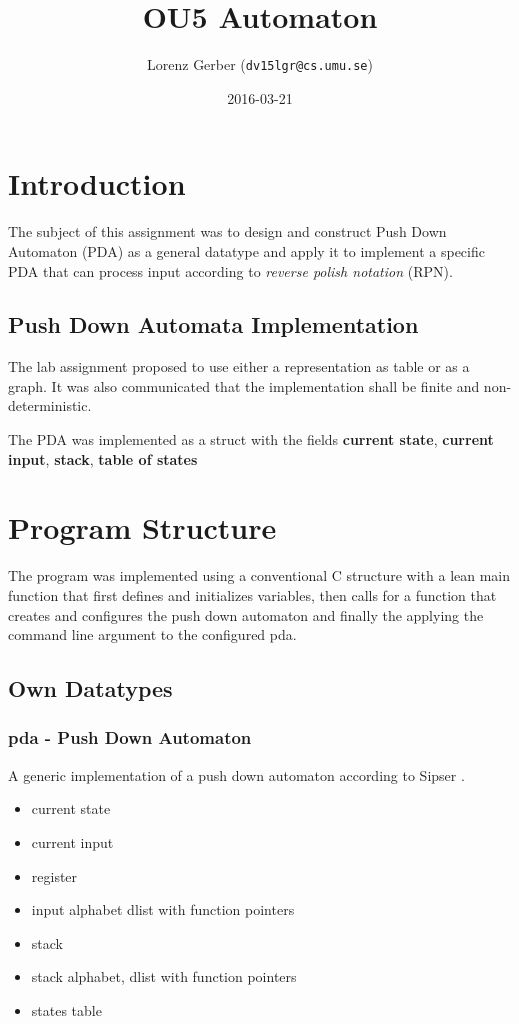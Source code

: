 \documentclass[a4paper,11pt,twoside]{article}
\title{OU5 Automaton}
\author{Lorenz Gerber ({\tt{dv15lgr@cs.umu.se}})}
\date{2016-03-21}
\begin{document}
\lstset{language=C}
\maketitle
\thispagestyle{empty}
\newpage
\tableofcontents
\thispagestyle{empty}
\newpage

\clearpage
{}

\section{Introduction} 
The subject of this assignment was to design and construct Push Down
Automaton (PDA) as a general datatype and apply it to implement a
specific PDA that can process input according to \textit{reverse
  polish notation} (RPN). 

\subsection{Push Down Automata Implementation}
The lab assignment proposed to use either a representation as table or
as a graph. It was also communicated that the implementation shall be
finite and non-deterministic.

The PDA was implemented as a struct with the fields \textbf{current
  state}, \textbf{current input}, \textbf{stack}, \textbf{table of states}

\section{Program Structure}
The program was implemented using a conventional C structure with a lean
main function that first defines and initializes variables, then calls
for a function that creates and configures the push down
automaton and finally the applying the command line argument to the
configured pda.

\subsection{Own Datatypes}

\subsubsection{pda - Push Down Automaton}
A generic implementation of a push down automaton according to Sipser
\cite[pp 112-125]{sipser2012}.

\begin{itemize}
\item current state
\item current input
\item register
\item input alphabet dlist with function pointers
\item stack
\item stack alphabet, dlist with function pointers
\item states table
\end{itemize}
\end{document}
